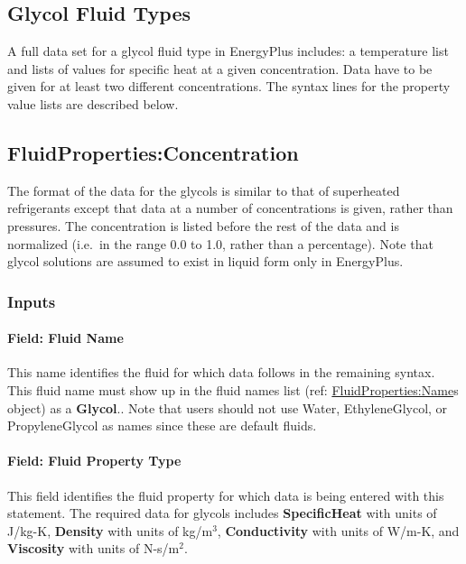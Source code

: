 \subsection{Glycol Fluid Types}\label{glycol-fluid-types}

A full data set for a glycol fluid type in EnergyPlus includes: a temperature list and lists of values for specific heat at a given concentration. Data have to be given for at least two different concentrations. The syntax lines for the property value lists are described below.

\subsection{FluidProperties:Concentration}\label{fluidpropertiesconcentration}

The format of the data for the glycols is similar to that of superheated refrigerants except that data at a number of concentrations is given, rather than pressures. The concentration is listed before the rest of the data and is normalized (i.e.~in the range 0.0 to 1.0, rather than a percentage). Note that glycol solutions are assumed to exist in liquid form only in EnergyPlus.

\subsubsection{Inputs}\label{inputs-5-012}

\paragraph{Field: Fluid Name}\label{field-fluid-name-2}

This name identifies the fluid for which data follows in the remaining syntax. This fluid name must show up in the fluid names list (ref: \hyperref[fluidpropertiesname]{FluidProperties:Name}s object) as a \textbf{Glycol}.. Note that users should not use Water, EthyleneGlycol, or PropyleneGlycol as names since these are default fluids.

\paragraph{Field: Fluid Property Type}\label{field-fluid-property-type-2}

This field identifies the fluid property for which data is being entered with this statement. The required data for glycols includes \textbf{SpecificHeat} with units of J/kg-K, \textbf{Density} with units of kg/m\(^{3}\), \textbf{Conductivity} with units of W/m-K, and \textbf{Viscosity} with units of N-s/m\(^{2}\).

